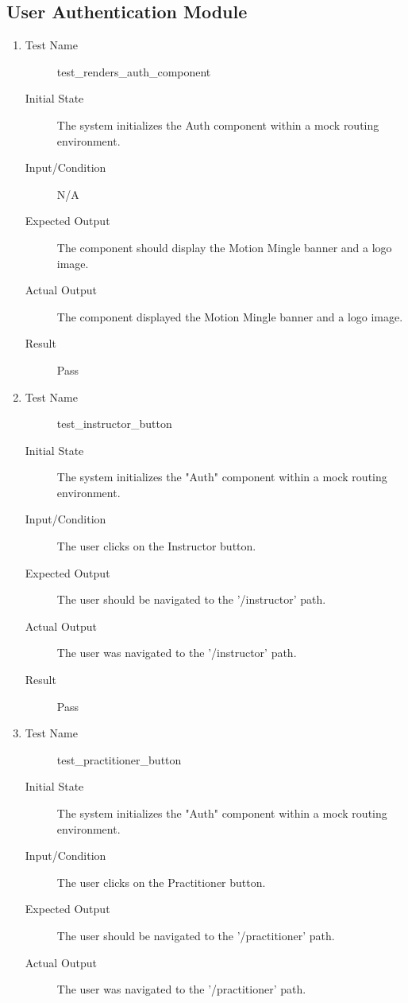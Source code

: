 \documentclass[12pt, titlepage]{article}
\begin{document}
\subsection{User Authentication Module}
\begin{enumerate}[UT-UA1]
  \item \label{UT-UA1}
    \begin{description}
    \item[Test Name] test\_renders\_auth\_component
    \item[Initial State] The system initializes the Auth component within a mock routing environment.
    \item[Input/Condition] N/A
    \item[Expected Output] The component should display the Motion Mingle banner and a logo image.
    \item[Actual Output] The component displayed the Motion Mingle banner and a logo image.
    \item[Result] Pass
    \end{description}
  \item \label{UT-UA2}
    \begin{description}
    \item[Test Name] test\_instructor\_button
    \item[Initial State] The system initializes the "Auth" component within a mock routing environment.
    \item[Input/Condition] The user clicks on the Instructor button.
    \item[Expected Output] The user should be navigated to the '/instructor' path.
    \item[Actual Output] The user was navigated to the '/instructor' path.
    \item[Result] Pass
    \end{description}
  \item \label{UT-UA3}
    \begin{description}
    \item[Test Name] test\_practitioner\_button
    \item[Initial State] The system initializes the "Auth" component within a mock routing environment.
    \item[Input/Condition]  The user clicks on the Practitioner button.
    \item[Expected Output] The user should be navigated to the '/practitioner' path.
    \item[Actual Output] The user was navigated to the '/practitioner' path.

\end{description}
\end{enumerate}
\end{document}
